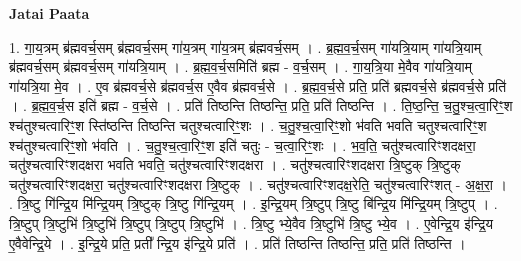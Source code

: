 \documentclass[17pt]{extarticle}
\begin{document}
\textbf{Jatai Paata} \newline

1. गा॒य॒त्रम् ब्र॑ह्मवर्च॒सम् ब्र॑ह्मवर्च॒सम् गा॑य॒त्रम् गा॑य॒त्रम् ब्र॑ह्मवर्च॒सम् । . ब्र॒ह्म॒व॒र्च॒सम् गा॑यत्रि॒याम् गा॑यत्रि॒याम् ब्र॑ह्मवर्च॒सम् ब्र॑ह्मवर्च॒सम् गा॑यत्रि॒याम् । . ब्र॒ह्म॒व॒र्च॒समिति॑ ब्रह्म - व॒र्च॒सम् । . गा॒य॒त्रि॒या मे॒वैव गा॑यत्रि॒याम् गा॑यत्रि॒या मे॒व । . ए॒व ब्र॑ह्मवर्च॒से ब्र॑ह्मवर्च॒स ए॒वैव ब्र॑ह्मवर्च॒से । . ब्र॒ह्म॒व॒र्च॒से प्रति॒ प्रति॑ ब्रह्मवर्च॒से ब्र॑ह्मवर्च॒से प्रति॑ । . ब्र॒ह्म॒व॒र्च॒स इति॑ ब्रह्म - व॒र्च॒से । . प्रति॑ तिष्ठन्ति तिष्ठन्ति॒ प्रति॒ प्रति॑ तिष्ठन्ति । . ति॒ष्ठ॒न्ति॒ च॒तु॒श्च॒त्वा॒रिꣳ॒॒श श्च॑तुश्चत्वारिꣳ॒॒श स्ति॑ष्ठन्ति तिष्ठन्ति चतुश्चत्वारिꣳ॒॒शः । . च॒तु॒श्च॒त्वा॒रिꣳ॒॒शो भ॑वति भवति चतुश्चत्वारिꣳ॒॒श श्च॑तुश्चत्वारिꣳ॒॒शो भ॑वति । . च॒तु॒श्च॒त्वा॒रिꣳ॒॒श इति॑ चतुः - च॒त्वा॒रिꣳ॒॒शः । . भ॒व॒ति॒ चतु॑श्चत्वारिꣳशदक्षरा॒ चतु॑श्चत्वारिꣳशदक्षरा भवति भवति॒ चतु॑श्चत्वारिꣳशदक्षरा । . चतु॑श्चत्वारिꣳशदक्षरा त्रि॒ष्टुक् त्रि॒ष्टुक् चतु॑श्चत्वारिꣳशदक्षरा॒ चतु॑श्चत्वारिꣳशदक्षरा त्रि॒ष्टुक् । . चतु॑श्चत्वारिꣳशदक्ष॒रेति॒ चतु॑श्चत्वारिꣳशत् - अ॒क्ष॒रा॒ । . त्रि॒ष्टु गि॑न्द्रि॒य मि॑न्द्रि॒यम् त्रि॒ष्टुक् त्रि॒ष्टु गि॑न्द्रि॒यम् । . इ॒न्द्रि॒यम् त्रि॒ष्टुप् त्रि॒ष्टु बि॑न्द्रि॒य मि॑न्द्रि॒यम् त्रि॒ष्टुप् । . त्रि॒ष्टुप् त्रि॒ष्टुभि॑ त्रि॒ष्टुभि॑ त्रि॒ष्टुप् त्रि॒ष्टुप् त्रि॒ष्टुभि॑ । . त्रि॒ष्टु भ्ये॒वैव त्रि॒ष्टुभि॑ त्रि॒ष्टु भ्ये॒व । . ए॒वेन्द्रि॒य इ॑न्द्रि॒य ए॒वैवेन्द्रि॒ये । . इ॒न्द्रि॒ये प्रति॒ प्रती᳚ न्द्रि॒य इ॑न्द्रि॒ये प्रति॑ । . प्रति॑ तिष्ठन्ति तिष्ठन्ति॒ प्रति॒ प्रति॑ तिष्ठन्ति । \newline
\end{document}
